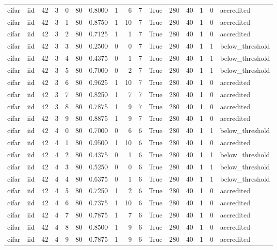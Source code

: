 \begin{tabular}{llrrrrrrrrrrrrrl}
cifar & iid & 42 & 3 & 0 & 80 & 0.8000 & 1 & 6 & 7 & True & 280 & 40 & 1 & 0 & accredited \\
cifar & iid & 42 & 3 & 1 & 80 & 0.8750 & 1 & 10 & 7 & True & 280 & 40 & 1 & 0 & accredited \\
cifar & iid & 42 & 3 & 2 & 80 & 0.7125 & 1 & 1 & 7 & True & 280 & 40 & 1 & 0 & accredited \\
cifar & iid & 42 & 3 & 3 & 80 & 0.2500 & 0 & 0 & 7 & True & 280 & 40 & 1 & 1 & below\_threshold \\
cifar & iid & 42 & 3 & 4 & 80 & 0.4375 & 0 & 1 & 7 & True & 280 & 40 & 1 & 1 & below\_threshold \\
cifar & iid & 42 & 3 & 5 & 80 & 0.7000 & 0 & 2 & 7 & True & 280 & 40 & 1 & 1 & below\_threshold \\
cifar & iid & 42 & 3 & 6 & 80 & 0.9625 & 1 & 10 & 7 & True & 280 & 40 & 1 & 0 & accredited \\
cifar & iid & 42 & 3 & 7 & 80 & 0.8250 & 1 & 7 & 7 & True & 280 & 40 & 1 & 0 & accredited \\
cifar & iid & 42 & 3 & 8 & 80 & 0.7875 & 1 & 9 & 7 & True & 280 & 40 & 1 & 0 & accredited \\
cifar & iid & 42 & 3 & 9 & 80 & 0.8875 & 1 & 9 & 7 & True & 280 & 40 & 1 & 0 & accredited \\
cifar & iid & 42 & 4 & 0 & 80 & 0.7000 & 0 & 6 & 6 & True & 280 & 40 & 1 & 1 & below\_threshold \\
cifar & iid & 42 & 4 & 1 & 80 & 0.9500 & 1 & 10 & 6 & True & 280 & 40 & 1 & 0 & accredited \\
cifar & iid & 42 & 4 & 2 & 80 & 0.4375 & 0 & 1 & 6 & True & 280 & 40 & 1 & 1 & below\_threshold \\
cifar & iid & 42 & 4 & 3 & 80 & 0.5250 & 0 & 0 & 6 & True & 280 & 40 & 1 & 1 & below\_threshold \\
cifar & iid & 42 & 4 & 4 & 80 & 0.6375 & 0 & 1 & 6 & True & 280 & 40 & 1 & 1 & below\_threshold \\
cifar & iid & 42 & 4 & 5 & 80 & 0.7250 & 1 & 2 & 6 & True & 280 & 40 & 1 & 0 & accredited \\
cifar & iid & 42 & 4 & 6 & 80 & 0.7375 & 1 & 10 & 6 & True & 280 & 40 & 1 & 0 & accredited \\
cifar & iid & 42 & 4 & 7 & 80 & 0.7875 & 1 & 7 & 6 & True & 280 & 40 & 1 & 0 & accredited \\
cifar & iid & 42 & 4 & 8 & 80 & 0.8500 & 1 & 9 & 6 & True & 280 & 40 & 1 & 0 & accredited \\
cifar & iid & 42 & 4 & 9 & 80 & 0.7875 & 1 & 9 & 6 & True & 280 & 40 & 1 & 0 & accredited \\

\end{tabular}

